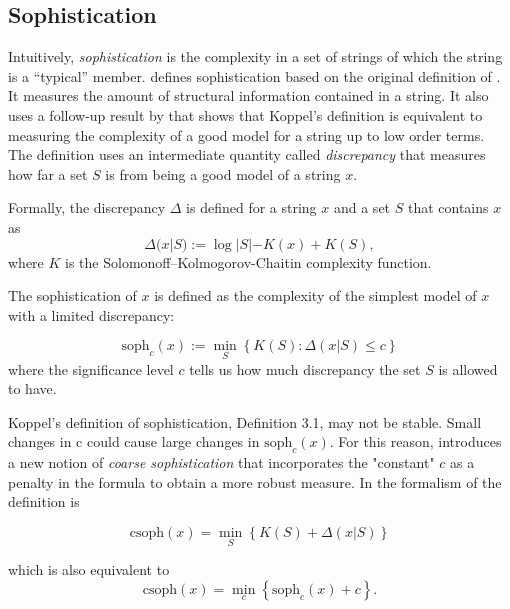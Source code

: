 \subsection{Sophistication}

Intuitively, \emph{sophistication} is the complexity in a set of strings of which
the string is a ``typical'' member.
\textcite{motaSophisticationRandomnessDeficiency2013} defines sophistication
based on the original definition of \textcite{koppelStructure1988,
  koppelAlmostMachineindependentTheory1991a}. It measures the amount of structural
information contained in a string. It also uses a follow-up result by
\parencite{vitanyiMeaningfulInformation2006} that shows that Koppel's definition
is equivalent to measuring the complexity of a good model for a string up to
low order terms. The definition uses an intermediate quantity called
\emph{discrepancy} that measures how far a set $S$ is from being a good model
of a string $x$.

Formally, the discrepancy $\Delta$ is defined for a string $x$ and a set $S$ that contains $x$ as
\begin{equation}
  \label{eq:6}
  \Delta(x|S) := \log |S| - K(x) + K(S),
\end{equation}
where $K$ is the Solomonoff–Kolmogorov-Chaitin complexity function.

The sophistication of $x$ is defined as the complexity of the simplest model of
$x$ with a limited discrepancy:

\begin{equation}
  \label{eq:7}
  \text{soph}_{c}(x) := \min_{S}\left\{ K(S): \Delta(x|S) \leq c \right\}
\end{equation}
where the significance level $c$ tells us how much discrepancy the set $S$ is allowed to have.

Koppel’s definition of sophistication, Definition 3.1, may not be stable. Small
changes in c could cause large changes in $\text{soph}_{c}(x)$. For this reason,
\textcite{antunesSophisticationRevisited2009} introduces a new notion of \emph{coarse
sophistication} that incorporates the "constant" $c$ as a penalty in the formula
to obtain a more robust measure.
In the formalism of \textcite{motaSophisticationRandomnessDeficiency2013} the
definition is

\begin{equation}
  \label{eq:8}
  \text{csoph}(x) = \min_{S}\left\{ K(S) + \Delta(x|S) \right\}
\end{equation}

which is also equivalent to
\begin{equation}
  \label{eq:8b}
  \text{csoph}(x) = \min_{c}\left\{ \text{soph}_{c}(x) + c \right\}.
\end{equation}

